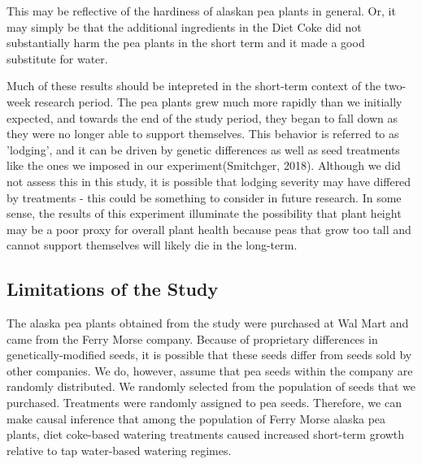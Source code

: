 \documentclass[1p,12pt]{elsarticle}\usepackage[]{graphicx}\usepackage[]{color}
\begin{document}
This may be reflective of the hardiness of alaskan pea plants in general. Or, it may simply be that the additional ingredients in the Diet Coke did not substantially harm the pea plants in the short term and it made a good substitute for water.

Much of these results should be intepreted in the short-term context of the two-week research period. The pea plants grew much more rapidly than we initially expected, and towards the end of the study period, they began to fall down as they were no longer able to support themselves. This behavior is referred to as 'lodging', and it can be driven by genetic differences as well as seed treatments like the ones we imposed in our experiment(Smitchger, 2018). Although we did not assess this in this study, it is possible that lodging severity may have differed by treatments - this could be something to consider in future research. In some sense, the results of this experiment illuminate the possibility that plant height may be a poor proxy for overall plant health because peas that grow too tall and cannot support themselves will likely die in the long-term. 

\subsection{Limitations of the Study}

The alaska pea plants obtained from the study were purchased at Wal Mart and came from the Ferry Morse company. Because of proprietary differences in genetically-modified seeds, it is possible that these seeds differ from seeds sold by other companies. We do, however, assume that pea seeds within the company are randomly distributed. We randomly selected from the population of seeds that we purchased.  Treatments were randomly assigned to pea seeds. Therefore, we can make causal inference that among the population of Ferry Morse alaska pea plants, diet coke-based watering treatments caused  increased short-term growth relative to tap water-based watering regimes. 
\end{document}
